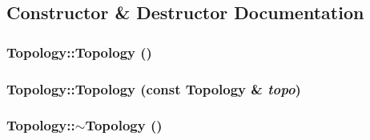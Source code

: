 \subsection{Constructor \& Destructor Documentation}
\hypertarget{classTopology_aa3336e10118cd76ab4b4c2ebc5062a9a}{
\subsubsection[{Topology}]{\setlength{\rightskip}{0pt plus 5cm}Topology::Topology ()}}
\label{classTopology_aa3336e10118cd76ab4b4c2ebc5062a9a}
\hypertarget{classTopology_a2659381e385f238e8d79ffb1a12e8d70}{
\subsubsection[{Topology}]{\setlength{\rightskip}{0pt plus 5cm}Topology::Topology (const {\bf Topology} \& {\em topo})}}
\label{classTopology_a2659381e385f238e8d79ffb1a12e8d70}
\hypertarget{classTopology_a3e447669757c8311c7f6f8edc705abf2}{
\subsubsection[{$\sim$Topology}]{\setlength{\rightskip}{0pt plus 5cm}Topology::$\sim$Topology ()}}
\label{classTopology_a3e447669757c8311c7f6f8edc705abf2}


